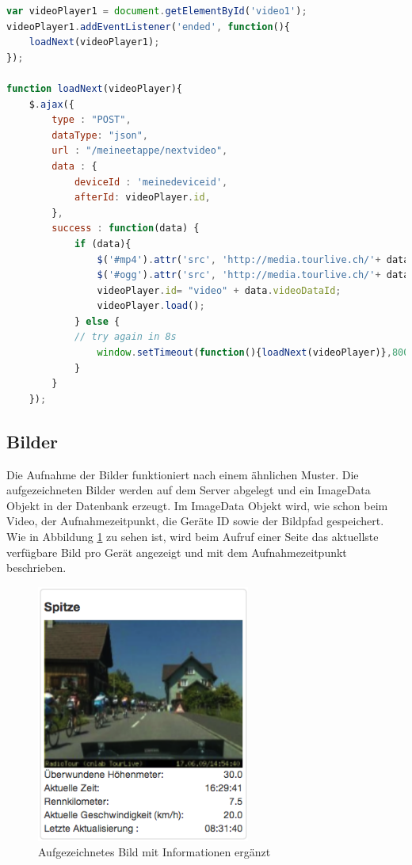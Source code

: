 \begin{lstlisting}[language=JavaScript, caption=Automatisches Nachladen von Videosequenzen]
var videoPlayer1 = document.getElementById('video1');
videoPlayer1.addEventListener('ended', function(){
	loadNext(videoPlayer1);
});

function loadNext(videoPlayer){
	$.ajax({
		type : "POST",
		dataType: "json",
		url : "/meineetappe/nextvideo",
		data : {
			deviceId : 'meinedeviceid',
			afterId: videoPlayer.id,
		},
		success : function(data) {
			if (data){
				$('#mp4').attr('src', 'http://media.tourlive.ch/'+ data.videoLocation + '.mp4');
				$('#ogg').attr('src', 'http://media.tourlive.ch/'+ data.videoLocation + '.ogg');
				videoPlayer.id= "video" + data.videoDataId;
				videoPlayer.load();
			} else {
			// try again in 8s
				window.setTimeout(function(){loadNext(videoPlayer)},8000);
			}
		}
	});
\end{lstlisting}

\subsection{Bilder}
Die Aufnahme der Bilder funktioniert nach einem ähnlichen Muster. Die aufgezeichneten Bilder werden auf dem Server abgelegt und ein ImageData Objekt in der Datenbank erzeugt. Im ImageData Objekt wird, wie schon beim Video, der Aufnahmezeitpunkt, die Geräte ID sowie der Bildpfad gespeichert. Wie in Abbildung \ref{fig:bildaufzeichnung} zu sehen ist, wird beim Aufruf einer Seite das aktuellste verfügbare Bild pro Gerät angezeigt und mit dem Aufnahmezeitpunkt beschrieben.
\begin{figure}[H]
	\centering
	\includegraphics[width=70mm]{images/tourliveweb/bildaufzeichnung.png}
	\caption{Aufgezeichnetes Bild mit Informationen ergänzt}
	\label{fig:bildaufzeichnung}
\end{figure}

